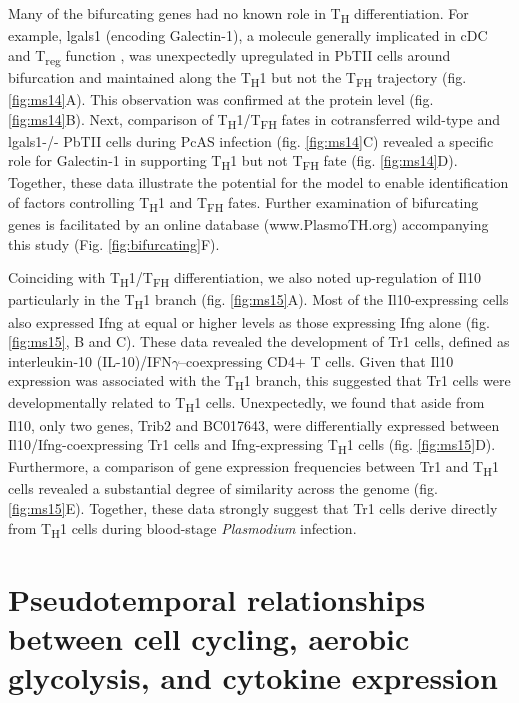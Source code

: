 Many of the bifurcating genes had no known role in T\textsubscript{H} differentiation. For example, lgals1 (encoding Galectin-1), a molecule generally implicated in cDC \cite{Poncini2015-um} and T\textsubscript{reg} function \cite{Garin2007-go}, was unexpectedly upregulated in PbTII cells around bifurcation and maintained along the T\textsubscript{H}1 but not the T\textsubscript{FH} trajectory (fig.  \ref{fig:ms14}A). This observation was confirmed at the protein level (fig.  \ref{fig:ms14}B). Next, comparison of T\textsubscript{H}1/T\textsubscript{FH} fates in cotransferred wild-type and lgals1-/- PbTII cells during PcAS infection (fig.  \ref{fig:ms14}C) revealed a specific role for Galectin-1 in supporting T\textsubscript{H}1 but not T\textsubscript{FH} fate (fig.  \ref{fig:ms14}D). Together, these data illustrate the potential for the  model to enable identification of factors controlling T\textsubscript{H}1 and T\textsubscript{FH} fates. Further examination of bifurcating genes is facilitated by an online database (www.PlasmoTH.org) accompanying this study (Fig.  \ref{fig:bifurcating}F).

Coinciding with T\textsubscript{H}1/T\textsubscript{FH} differentiation, we also noted up-regulation of Il10 particularly in the T\textsubscript{H}1 branch (fig.  \ref{fig:ms15}A). Most of the Il10-expressing cells also expressed Ifng at equal or higher levels as those expressing Ifng alone (fig.  \ref{fig:ms15}, B and C). These data revealed the development of Tr1 cells, defined as interleukin-10 (IL-10)/IFN\( \gamma \)–coexpressing CD4+ T cells. Given that Il10 expression was associated with the T\textsubscript{H}1 branch, this suggested that Tr1 cells were developmentally related to T\textsubscript{H}1 cells. Unexpectedly, we found that aside from Il10, only two genes, Trib2 and BC017643, were differentially expressed between Il10/Ifng-coexpressing Tr1 cells and Ifng-expressing T\textsubscript{H}1 cells (fig.  \ref{fig:ms15}D). Furthermore, a comparison of gene expression frequencies between Tr1 and T\textsubscript{H}1 cells revealed a substantial degree of similarity across the genome (fig.  \ref{fig:ms15}E). Together, these data strongly suggest that Tr1 cells derive directly from T\textsubscript{H}1 cells during blood-stage \textit{Plasmodium} infection.

\section{Pseudotemporal relationships between cell cycling, aerobic glycolysis, and cytokine expression}

